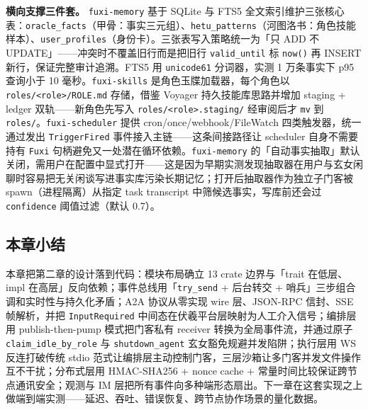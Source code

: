 \textbf{横向支撑三件套。} \texttt{fuxi-memory} 基于 SQLite 与 FTS5 全文索引维护三张核心表：\texttt{oracle\_facts}（甲骨：事实三元组）、\texttt{hetu\_patterns}（河图洛书：角色技能样本）、\texttt{user\_profiles}（身份卡）。三张表写入策略统一为「只 ADD 不 UPDATE」——冲突时不覆盖旧行而是把旧行 \texttt{valid\_until} 标 \texttt{now()} 再 INSERT 新行，保证完整审计追溯。FTS5 用 \texttt{unicode61} 分词器，实测 1 万条事实下 p95 查询小于 10 毫秒。\texttt{fuxi-skills} 是角色玉牒加载器，每个角色以 \texttt{roles/<role>/ROLE.md} 存储，借鉴 Voyager\parencite{wang2023voyager} 持久技能库思路并增加 staging + ledger 双轨——新角色先写入 \texttt{roles/<role>.staging/} 经审阅后才 \texttt{mv} 到 \texttt{roles/}。\texttt{fuxi-scheduler} 提供 cron/once/webhook/FileWatch 四类触发器，统一通过发出 \texttt{TriggerFired} 事件接入主链——这条间接路径让 scheduler 自身不需要持有 \texttt{Fuxi} 句柄避免又一处潜在循环依赖。\texttt{fuxi-memory} 的「自动事实抽取」默认关闭，需用户在配置中显式打开——这是因为早期实测发现抽取器在用户与玄女闲聊时容易把无关闲谈写进事实库污染长期记忆；打开后抽取器作为独立子门客被 spawn（进程隔离）从指定 task transcript 中筛候选事实，写库前还会过 \texttt{confidence} 阈值过滤（默认 0.7）。

\subsection{本章小结}

本章把第二章的设计落到代码：模块布局确立 13 crate 边界与「trait 在低层、impl 在高层」反向依赖；事件总线用「\texttt{try\_send} + 后台转交 + 哨兵」三步组合调和实时性与持久化矛盾；A2A 协议从零实现 wire 层、JSON-RPC 信封、SSE 帧解析，并把 \texttt{InputRequired} 中间态在伏羲平台层映射为人工介入信号；编排层用 publish-then-pump 模式把门客私有 receiver 转换为全局事件流，并通过原子 \texttt{claim\_idle\_by\_role} 与 \texttt{shutdown\_agent} 玄女豁免规避并发陷阱；执行层用 WS 反连打破传统 stdio 范式让编排层主动控制门客，三层沙箱让多门客并发文件操作互不干扰；分布式层用 HMAC-SHA256 + nonce cache + 常量时间比较保证跨节点通讯安全；观测与 IM 层把所有事件向多种端形态扇出。下一章在这套实现之上做端到端实测——延迟、吞吐、错误恢复、跨节点协作场景的量化数据。
